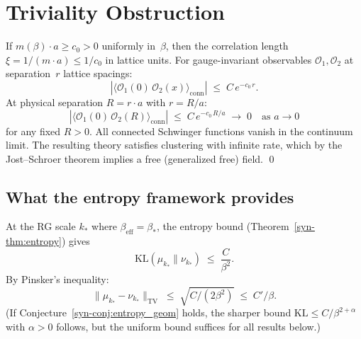 \documentclass[11pt]{article}
\theoremstyle{definition}
\newcommand{\KL}{\mathrm{KL}}
\newcommand{\TV}{\mathrm{TV}}
\begin{document}

\section{Triviality Obstruction}\label{sec:triviality}


If $m(\beta) \cdot a \geq c_0 > 0$ uniformly in~$\beta$, then
the correlation length $\xi = 1/(m \cdot a) \leq 1/c_0$
in lattice units.  For gauge-invariant observables
$\mathcal{O}_1, \mathcal{O}_2$ at separation~$r$ lattice spacings:
\begin{equation}
  |\langle \mathcal{O}_1(0)\,\mathcal{O}_2(x)\rangle_{\mathrm{conn}}|
  \;\leq\; C\,e^{-c_0\,r}.
\end{equation}
At physical separation $R = r \cdot a$ with $r = R/a$:
\begin{equation}
  |\langle \mathcal{O}_1(0)\,\mathcal{O}_2(R)\rangle_{\mathrm{conn}}|
  \;\leq\; C\,e^{-c_0\,R/a} \;\to\; 0 \quad \text{as } a \to 0
\end{equation}
for any fixed $R > 0$.  All connected Schwinger functions
vanish in the continuum limit.  The resulting theory
satisfies clustering with infinite rate, which by the
Jost--Schroer theorem implies a free (generalized free) field.
\qed

\subsection{What the entropy framework provides}

At the RG scale $k_*$ where $\beta_{\mathrm{eff}} = \beta_*$,
the entropy bound (Theorem~\ref{syn-thm:entropy}) gives
\begin{equation}
  \KL(\mu_{k_*} \| \nu_{k_*})
  \;\leq\; \frac{C}{\beta^2}.
\end{equation}
By Pinsker's inequality:
\begin{equation}\label{syn-eq:pinsker}
  \|\mu_{k_*} - \nu_{k_*}\|_{\TV}
  \;\leq\; \sqrt{C / (2\beta^{2})}
  \;\leq\; C' / \beta.
\end{equation}
\textup{(}If Conjecture~\ref{syn-conj:entropy_geom}
holds, the sharper bound
$\KL \leq C/\beta^{2+\alpha}$ with
$\alpha > 0$ follows, but the uniform
bound suffices for all results below.\textup{)}
\end{document}
